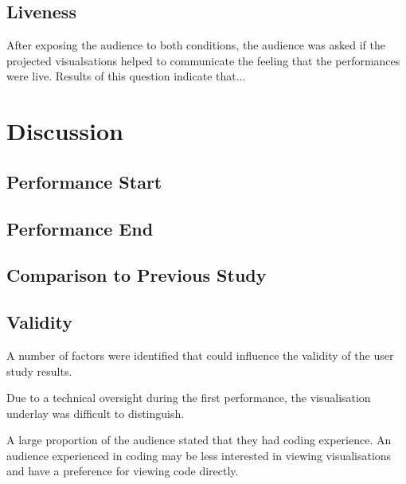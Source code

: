 \subsection{Liveness}

After exposing the audience to both conditions, the audience was asked if the projected visualsations helped to communicate the feeling that the performances were live. Results of this question indicate that...

\more

\section{Discussion}



\subsection{Performance Start}


\subsection{Performance End}


\subsection{Comparison to Previous Study}



\subsection{Validity}

A number of factors were identified that could influence the validity of the user study results.

Due to a technical oversight during the first performance, the visualisation underlay was difficult to distinguish. 

A large proportion of the audience stated that they had coding experience. An audience experienced in coding may be less interested in viewing visualisations and have a preference for viewing code directly.

